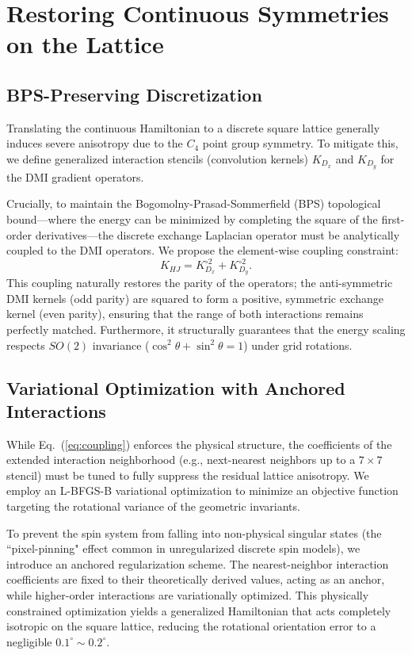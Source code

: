 \documentclass[reprint,amsmath,amssymb,aps,prapplied,longbibliography]{revtex4-2}
\begin{document}
\section{Restoring Continuous Symmetries on the Lattice}

\subsection{BPS-Preserving Discretization}
Translating the continuous Hamiltonian to a discrete square lattice generally induces severe anisotropy due to the $C_4$ point group symmetry. To mitigate this, we define generalized interaction stencils (convolution kernels) $K_{D_x}$ and $K_{D_y}$ for the DMI gradient operators. 

Crucially, to maintain the Bogomolny-Prasad-Sommerfield (BPS) topological bound—where the energy can be minimized by completing the square of the first-order derivatives—the discrete exchange Laplacian operator must be analytically coupled to the DMI operators. We propose the element-wise coupling constraint:
\begin{equation}
K_{HJ} = K_{D_x}^{\circ 2} + K_{D_y}^{\circ 2}.
\label{eq:coupling}
\end{equation}
This coupling naturally restores the parity of the operators; the anti-symmetric DMI kernels (odd parity) are squared to form a positive, symmetric exchange kernel (even parity), ensuring that the range of both interactions remains perfectly matched. Furthermore, it structurally guarantees that the energy scaling respects $SO(2)$ invariance ($\cos^2\theta + \sin^2\theta = 1$) under grid rotations.

\subsection{Variational Optimization with Anchored Interactions}
While Eq.~(\ref{eq:coupling}) enforces the physical structure, the coefficients of the extended interaction neighborhood (e.g., next-nearest neighbors up to a $7\times7$ stencil) must be tuned to fully suppress the residual lattice anisotropy. We employ an L-BFGS-B variational optimization to minimize an objective function targeting the rotational variance of the geometric invariants.

To prevent the spin system from falling into non-physical singular states (the ``pixel-pinning" effect common in unregularized discrete spin models), we introduce an anchored regularization scheme. The nearest-neighbor interaction coefficients are fixed to their theoretically derived values, acting as an anchor, while higher-order interactions are variationally optimized. This physically constrained optimization yields a generalized Hamiltonian that acts completely isotropic on the square lattice, reducing the rotational orientation error to a negligible $0.1^\circ \sim 0.2^\circ$.
\end{document}
